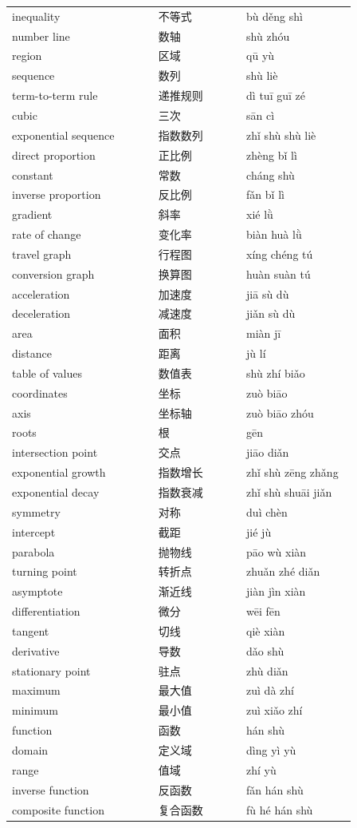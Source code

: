 \documentclass[11pt]{article}
\begin{document}
\begin{longtable}{@{}p{0.40\linewidth}p{0.24\linewidth}p{0.30\linewidth}@{}}
inequality & 不等式 & bù děng shì \\
number line & 数轴 & shù zhóu \\
region & 区域 & qū yù \\
sequence & 数列 & shù liè \\
term-to-term rule & 递推规则 & dì tuī guī zé \\
cubic & 三次 & sān cì \\
exponential sequence & 指数数列 & zhǐ shù shù liè \\
direct proportion & 正比例 & zhèng bǐ lì \\
constant & 常数 & cháng shù \\
inverse proportion & 反比例 & fǎn bǐ lì \\
gradient & 斜率 & xié lǜ \\
rate of change & 变化率 & biàn huà lǜ \\
travel graph & 行程图 & xíng chéng tú \\
conversion graph & 换算图 & huàn suàn tú \\
acceleration & 加速度 & jiā sù dù \\
deceleration & 减速度 & jiǎn sù dù \\
area & 面积 & miàn jī \\
distance & 距离 & jù lí \\
table of values & 数值表 & shù zhí biǎo \\
coordinates & 坐标 & zuò biāo \\
axis & 坐标轴 & zuò biāo zhóu \\
roots & 根 & gēn \\
intersection point & 交点 & jiāo diǎn \\
exponential growth & 指数增长 & zhǐ shù zēng zhǎng \\
exponential decay & 指数衰减 & zhǐ shù shuāi jiǎn \\
symmetry & 对称 & duì chèn \\
intercept & 截距 & jié jù \\
parabola & 抛物线 & pāo wù xiàn \\
turning point & 转折点 & zhuǎn zhé diǎn \\
asymptote & 渐近线 & jiàn jìn xiàn \\
differentiation & 微分 & wēi fēn \\
tangent & 切线 & qiè xiàn \\
derivative & 导数 & dǎo shù \\
stationary point & 驻点 & zhù diǎn \\
maximum & 最大值 & zuì dà zhí \\
minimum & 最小值 & zuì xiǎo zhí \\
function & 函数 & hán shù \\
domain & 定义域 & dìng yì yù \\
range & 值域 & zhí yù \\
inverse function & 反函数 & fǎn hán shù \\
composite function & 复合函数 & fù hé hán shù \\
\end{longtable}
\end{document}
